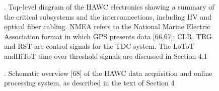 \begin{figure}
    \caption{. Top-level diagram of the HAWC electronics showing a summary of the critical subsystems and the interconnections, including HV and optical fiber cabling. NMEA refers to the National Marine Electric Association format in which GPS presents data [66,67]; CLR, TRG and RST are control signals for the TDC system. The LoToT andHiToT time over threshold signals are discussed in Section 4.1}
    \label{fig:basic_tanks_schem}
\end{figure}

\begin{figure}
    \caption{. Schematic overview [68] of the HAWC data acquisition and online processing system, as described in the text of Section 4}
    \label{fig:dig_schem}
\end{figure}

